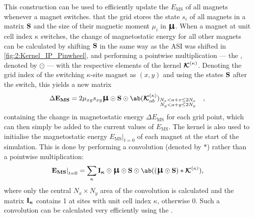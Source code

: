 This construction can be used to efficiently update the  $E_\mathrm{MS}$ of all magnets whenever a magnet switches.
 that the grid stores the state $s_i$ of all magnets in a matrix $\boldsymbol{\mathbf{S}}$ and the size of their magnetic moment $\mu_i$ in $\vc{\bigmu}$.
When a magnet at unit cell index $\kappa$ switches, the change of magnetostatic energy for all other magnets can be calculated by shifting $\boldsymbol{\mathbf{S}}$ in the same way as the ASI was shifted in \cref{fig:2:Kernel_IP_Pinwheel}, and performing a pointwise multiplication --- the , denoted by $\odot$ --- with the respective elements of the kernel $\boldsymbol{\mathbf{\mathcal{K}}}^{(\kappa)}$.
Denoting the grid index of the switching $\kappa$-site magnet as $(x,y)$ and using the states $\boldsymbol{\mathbf{S}}$ after the switch, this yields a new matrix
\begin{equation}
	\label{eq:2:Kernel_update}
	\Delta \vc{E_\mathrm{MS}} = 2\mu_{xy} s_{xy}\vc{\bigmu} \odot \vc{S} \odot \ab(\vc{\mathcal{K}}^{(\kappa)}_{ab})_{\substack{N_x < a + x \leq 2N_x \\ N_y < a + y \leq 2N_y}} \quad\mathrm{,}
\end{equation}
containing the change in magnetostatic energy $\Delta E_\mathrm{MS}$ for each grid point, which can then simply be added to the current values of $E_\mathrm{MS}$. \newpage
The kernel is also used to initialise the magnetostatic energy $\left. E_\mathrm{MS} \right|_{t=0}$ of each magnet at the start of the simulation.
This is done by performing a convolution (denoted by $*$) rather than a pointwise multiplication:
\begin{equation}
	\label{eq:2:Kernel_init}
	\left. \vc{E_\mathrm{MS}} \right|_{t=0} = \sum_\kappa \vc{I_\kappa} \odot \vc{\bigmu} \odot \vc{S} \odot \ab((\vc{\bigmu} \odot \vc{S}) * \vc{\mathcal{K}}^{(\kappa)}) \mathrm{,}
\end{equation}
where only the central $N_x \times N_y$ area of the convolution is calculated and the matrix $\boldsymbol{\mathbf{I_\kappa}}$ contains 1 at sites with unit cell index $\kappa$, otherwise 0.
Such a convolution can be calculated very efficiently using the . \\\par


